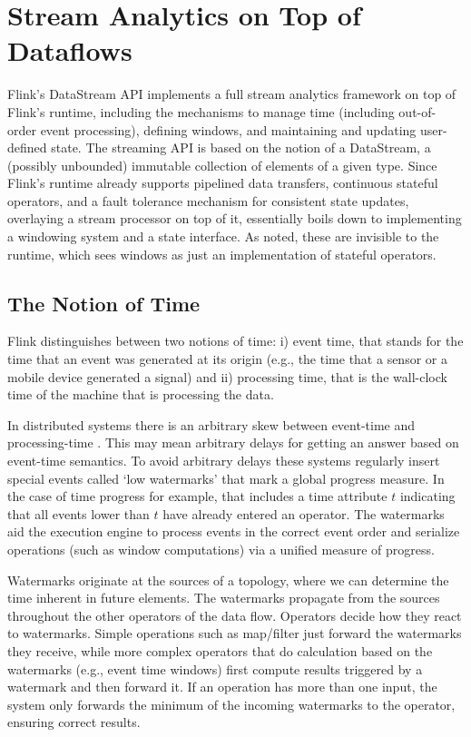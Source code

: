 \section{Stream Analytics on Top of Dataflows}
\label{sec:streaming}

Flink’s DataStream API implements a full stream analytics framework on top of Flink’s runtime, including the mechanisms to manage time (including out-of-order event processing), defining windows, and maintaining and updating user-defined state. The streaming API is based on the notion of a DataStream, a (possibly unbounded) immutable collection of elements of a given type. Since Flink’s runtime already supports pipelined data transfers, continuous stateful operators, and a fault tolerance mechanism for consistent state updates, overlaying a stream processor on top of it, essentially boils down to implementing a windowing system and a state interface. As noted, these are invisible to the runtime, which sees windows as just an implementation of stateful operators. 

\subsection{The Notion of Time}
\label{sec:streaming-time}
Flink distinguishes between two notions of time: i) event time, that  stands for the time that an event was generated at its origin (e.g., the time that a sensor or a mobile device generated a signal) and ii) processing time, that is the wall-clock time of the machine that is processing the data.

In distributed systems there is an arbitrary skew between event-time and processing-time \cite{akidau2015dataflow}. This may mean arbitrary delays for getting an answer based on event-time semantics. To avoid arbitrary delays these systems regularly insert special events called ‘low watermarks’ that mark a global progress measure. In the case of time progress for example, that includes a time attribute $t$ indicating that all events lower than $t$ have already entered an operator. The watermarks aid the execution engine to process events in the correct event order and serialize operations (such as window computations) via a unified measure of progress.

Watermarks originate at the sources of a topology, where we can determine the time inherent in future elements. The watermarks propagate from the sources throughout the other operators of the data flow. Operators decide how they react to watermarks. Simple operations such as map/filter just forward the watermarks they receive, while more complex operators that do calculation based on the watermarks (e.g., event time windows) first compute results triggered by a watermark and then forward it. If an operation has more than one input, the system only forwards the minimum of the incoming watermarks to the operator, ensuring correct results. 

